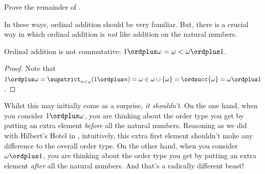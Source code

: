 \documentclass[../../../include/open-logic-section]{subfiles}
\begin{document}
\begin{prob}
Prove the remainder of
.
\end{prob}

In these ways, ordinal addition should be very familiar. But, there is a crucial way in which ordinal addition is \emph{not} like addition on the natural numbers.

\begin{prop}
Ordinal addition is {not} commutative; $1 \ordplus  \omega = \omega <
\omega \ordplus  1$.
\end{prop}

\begin{proof}
Note that $1 \ordplus  \omega = \supstrict_{n < \omega} (1 \ordplus n)
= \omega \in \omega \cup \{\omega\} = \ordsucc{\omega} = \omega
\ordplus  1$.
\end{proof}
\noindent 
Whilst this may initially come as a surprise, \emph{it shouldn't}. On
the one hand, when you consider $1 \ordplus  \omega$, you are thinking
about the order type you get by putting an extra element \emph{before}
all the natural numbers. Reasoning as we did with Hilbert's Hotel in
, intuitively, this extra first
element shouldn't make any difference to the overall order type. On
the other hand, when you consider $\omega \ordplus  1$, you are
thinking about the order type you get by putting an extra element
\emph{after} all the natural numbers. And that's a radically different
beast!
\end{document}
